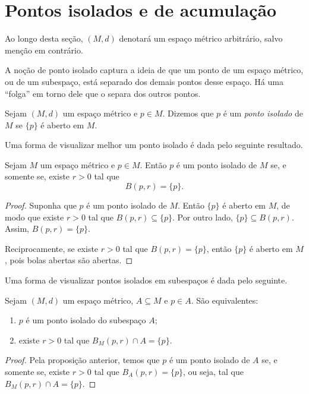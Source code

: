 
\section{Pontos isolados e de acumulação}

Ao longo desta seção, $(M,d)$ denotará um espaço métrico arbitrário, salvo menção em contrário.

A noção de ponto isolado captura a ideia de que um ponto de um espaço métrico, ou de um subespaço, está separado dos demais pontos desse espaço.
Há uma ``folga'' em torno dele que o separa dos outros pontos.

\begin{definition}
    Sejam $(M,d)$ um espaço métrico e $p\in M$.
    Dizemos que $p$ é um \emph{ponto isolado} de $M$ se $\{p\}$ é aberto em $M$.
\end{definition}

Uma forma de visualizar melhor um ponto isolado é dada pelo seguinte resultado.

\begin{proposition}
    Sejam $M$ um espaço métrico e $p \in M$.
    Então $p$ é um ponto isolado de $M$ se, e somente se, existe $r>0$ tal que
    \[
        B(p, r)= \{p\}.
    \]
\end{proposition}
\begin{proof}
    Suponha que $p$ é um ponto isolado de $M$.
    Então $\{p\}$ é aberto em $M$, de modo que existe $r>0$ tal que $B(p, r)\subseteq \{p\}$.
    Por outro lado, $\{p\}\subseteq B(p, r)$.
    Assim, $B(p, r)=\{p\}$.

    Reciprocamente, se existe $r>0$ tal que $B(p, r)=\{p\}$, então $\{p\}$ é aberto em $M$, pois bolas abertas são abertas.
\end{proof}

Uma forma de visualizar pontos isolados em subespaços é dada pelo seguinte.

\begin{proposition}\label{prop:pontoIsoladoSubespaco}
    Sejam $(M,d)$ um espaço métrico, $A\subseteq M$ e $p \in A$.
    São equivalentes:
    \begin{enumerate}[label=(\roman*)]
        \item $p$ é um ponto isolado do subespaço $A$;
        \item existe $r>0$ tal que $B_M(p, r)\cap A = \{p\}$.
    \end{enumerate}
\end{proposition}
\begin{proof}
    Pela proposição anterior, temos que $p$ é um ponto isolado de $A$ se, e somente se, existe $r>0$ tal que $B_A(p, r)=\{p\}$, ou seja, tal que $B_M(p, r)\cap A=\{p\}$.
\end{proof}

